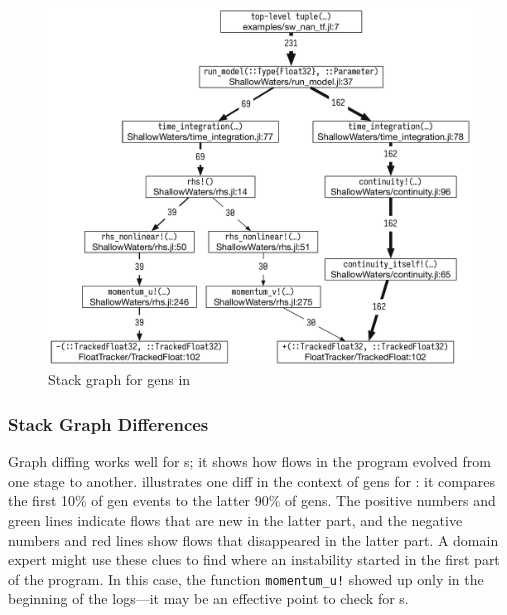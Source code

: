 \documentclass{juliacon}
\begin{document}
\begin{figure}[t]
  \centering
  \includegraphics[width=0.96\columnwidth]{fig/sw_nan_cstg_clean.pdf}
  \caption{Stack graph for \NaN{} gens in \ShallowWaters{}}
  \label{fig:sw_nan_cstg}
\end{figure}



\subsubsection{Stack Graph Differences}

Graph diffing works well for \CSTG{}s; it shows how flows in the program evolved
from one stage to another.
 illustrates one diff in the context of \NaN{} gens for
\ShallowWaters{}:
it compares the first 10\% of gen events to the latter 90\% of gens.
The positive numbers and green lines indicate flows that are new in the latter part,
and the negative numbers and red lines show flows that disappeared in the latter part.
A domain expert might use these clues to find where an instability started in
the first part of the program.
In this case, the function \texttt{momentum\_u!} showed up only in the
beginning of the logs---it may be an effective point to check for \Nan{}s.
\end{document}
